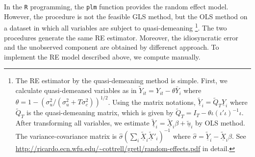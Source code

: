 \documentclass[
  12pt,
]{article}
\begin{document}
In the \texttt{R} programming, the \texttt{plm} function provides the
random effect model. However, the procedure is not the feasible GLS
method, but the OLS method on a dataset in which all variables are
subject to quasi-demeaning \footnote{The RE estimator by the
  quasi-demeaning method is simple. First, we calculate quasi-demeaned
  variables as in \(\tilde{Y}_{it} = Y_{it} - \theta \bar{Y}_i\) where
  \(\theta = 1 - (\sigma_u^2/(\sigma_u^2 + T \sigma_c^2))^{1/2}\). Using
  the matrix notations,
  \(\tilde{\underline{Y}}_i = \tilde{Q}_T \underline{Y}_i\) where
  \(\tilde{Q}_T\) is the quasi-demeaning matrix, which is given by
  \(\tilde{Q}_T = I_T - \theta \iota (\iota' \iota)^{-1} \iota\). After
  transforming all variables, we estimate
  \(\tilde{\underline{Y}}_i = \tilde{\underline{X}}_i \beta + \tilde{\underline{u}}_i\)
  by OLS method. The variance-covariance matrix is
  \(\hat{\sigma} (\sum_i \tilde{\underline{X}}_i \tilde{\underline{X}}'_i)^{-1}\)
  where
  \(\hat{\sigma} = \tilde{\underline{Y}}_i - \tilde{\underline{X}}_i \hat{\beta}\).
  See
  \url{http://ricardo.ecn.wfu.edu/~cottrell/gretl/random-effects.pdf} in
  detail.}. The two procedures generate the same RE estimator. Moreover,
the idiosyncratic error and the unobserved component are obtained by
differenct approach. To implement the RE model described above, we
compute manually.
\end{document}
